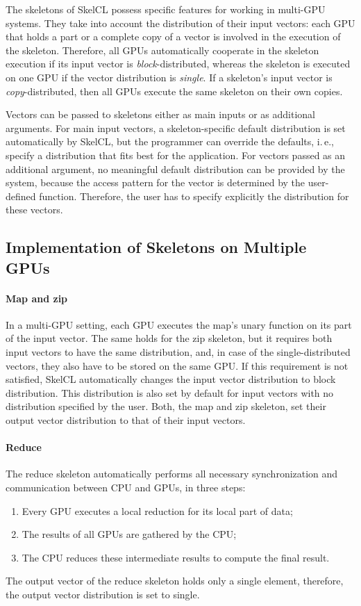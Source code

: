 The skeletons of SkelCL possess specific features for working in multi-GPU systems.
They take into account the distribution of their input vectors: each GPU that holds a part or a complete copy of a vector is involved in the execution of the skeleton.
Therefore, all GPUs automatically cooperate in the skeleton execution if its input vector is \emph{block}-distributed, whereas the skeleton is executed on one GPU if the vector distribution is \emph{single}.
If a skeleton's input vector is \emph{copy}-distributed, then all GPUs execute the same skeleton on their own copies.

Vectors can be passed to skeletons either as main inputs or as additional arguments.
For main input vectors, a skeleton-specific default distribution is set automatically by SkelCL, but the programmer can override the defaults, i.\,e., specify a distribution that fits best for the application.
For vectors passed as an additional argument, no meaningful default distribution can be provided by the system, because the access pattern for the vector is determined by the user-defined function.
Therefore, the user has to specify explicitly the distribution for these vectors.

\subsection{Implementation of Skeletons on Multiple GPUs}

\paragraph{Map and zip}
In a multi-GPU setting, each GPU executes the map's unary function on its part of the input vector.
The same holds for the zip skeleton, but it requires both input vectors to have the same distribution, and, in case of the single-distributed vectors, they also have to be stored on the same GPU.
If this requirement is not satisfied, SkelCL automatically changes the input vector distribution to block distribution.
This distribution is also set by default for input vectors with no distribution specified by the user.
Both, the map and zip skeleton, set their output vector distribution to that of their input vectors.

\paragraph{Reduce}
The reduce skeleton automatically performs all necessary synchronization and communication between CPU and GPUs, in three steps:
\begin{enumerate}
 \item Every GPU executes a local reduction for its local part of data;
 \item The results of all GPUs are gathered by the CPU;
 \item The CPU reduces these intermediate results to compute the final result.
\end{enumerate}
The output vector of the reduce skeleton holds only a single element, therefore, the output vector distribution is set to single.

